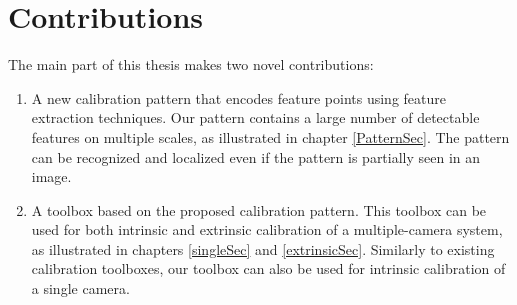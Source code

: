 \documentclass{report}
\begin{document}
\section{Contributions}

The main part of this thesis makes two novel contributions: 

\begin{enumerate}
\item A new calibration pattern that encodes feature points using feature extraction techniques. Our pattern contains a large number of detectable features on multiple scales, as illustrated in chapter \ref{PatternSec}. The pattern can be recognized and localized even if the pattern is partially seen in an image. 
\item A toolbox based on the proposed calibration pattern. This toolbox can be used for both intrinsic and extrinsic calibration of a multiple-camera system, as illustrated in chapters \ref{singleSec} and \ref{extrinsicSec}. Similarly to existing calibration toolboxes, our toolbox can also be used for intrinsic calibration of a single camera. 
\end{enumerate}
\end{document}
